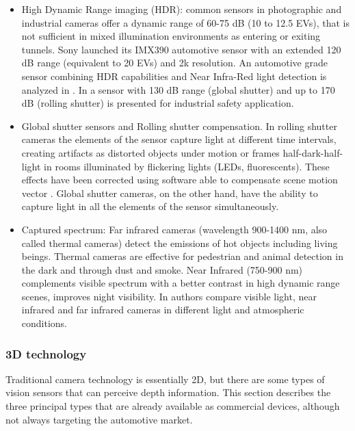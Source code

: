 \begin{itemize}    
    \item High Dynamic Range imaging (HDR): common sensors in photographic and 
    industrial cameras offer a dynamic range of 60-75 dB (10 to 12.5 EVs),
    that is not sufficient in mixed illumination environments as entering or 
    exiting tunnels. Sony launched its IMX390 automotive sensor with an
    extended 120 dB range (equivalent to 20 EVs) and 2k resolution. 
    An automotive grade sensor combining HDR capabilities and 
    Near Infra-Red light detection is analyzed in \cite{Maddalena2005}. 
    In \cite{Strobel2013} a sensor with 130 dB range (global shutter) and up
    to 170 dB (rolling shutter) is presented for industrial safety application.
    
    \item Global shutter sensors and Rolling shutter compensation. In rolling
    shutter cameras the elements of the sensor capture light at different time 
    intervals, creating artifacts as distorted objects under motion or frames
    half-dark-half-light in rooms illuminated by flickering lights (LEDs, 
    fluorescents). 
    These effects have been corrected using software able to compensate scene
    motion vector \cite{Chia-KaiLiang2008}\cite{Chun2008}. Global shutter
    cameras, on the other hand, have the ability to capture light in all the
    elements of the sensor simultaneously. 
        
    \item Captured spectrum: Far infrared cameras (wavelength 900-1400 nm, also
    called thermal cameras) detect the emissions of hot objects including
    living beings. 
    Thermal cameras are effective for pedestrian and animal detection
    \cite{OMalley2008}\cite{Besbes2015} in the dark and through dust and smoke.
    Near Infrared (750-900 nm) complements visible spectrum with a better
    contrast in high dynamic range scenes, improves night visibility. 
    In \cite{Pinchon2018} authors compare visible light, near infrared and far
    infrared cameras in different light and atmospheric conditions.
    
\end{itemize} 

\subsubsection{3D technology}
Traditional camera technology is essentially 2D, but there are some
types of vision sensors that can perceive depth information. This section
describes the three principal types that are already available as commercial
devices, although not always targeting the automotive market.


